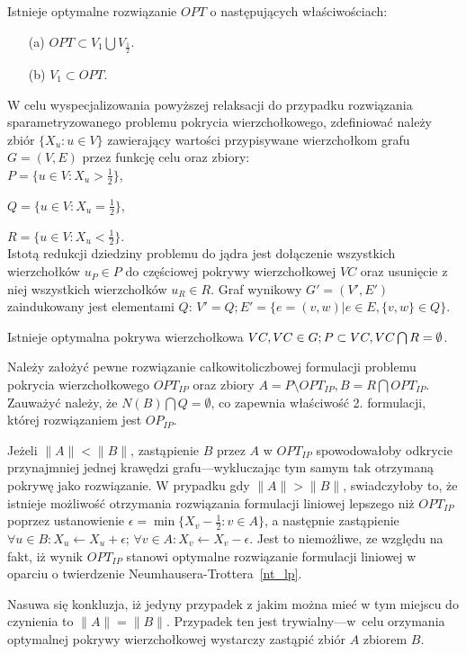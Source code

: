 \begin{nt}
  Istnieje optymalne rozwiązanie $OPT$ o następujących właściwościach:
  \begin{itemize}
    \item[(a)] $OPT \subset V_1 \bigcup V_{\frac{1}{2}}$.
    \item[(b)] $V_1 \subset OPT$.
  \end{itemize}
\end{nt}

W celu wyspecjalizowania powyższej relaksacji do przypadku rozwiązania
sparametryzowanego problemu pokrycia wierzchołkowego, zdefiniować należy zbiór 
$\{ X_u : u \in V \}$ zawierający wartości przypisywane wierzchołkom grafu 
$G=(V,E)$ przez funkcję celu oraz zbiory:\\


$P=\{u \in V : X_u>\frac{1}{2}\}$,\par
$Q=\{u \in V : X_u=\frac{1}{2}\}$,\par
$R=\{u \in V : X_u<\frac{1}{2}\}$.\\


Istotą redukcji dziedziny problemu do jądra jest dołączenie wszystkich
wierzchołków $u_P \in P$ do częściowej pokrywy wierzchołkowej $VC$ oraz 
usunięcie z niej wszystkich wierzchołków $u_R \in R$.
Graf wynikowy $G\prime=(V\prime, E\prime)$ zaindukowany jest elementami $Q$: 
$V\prime=Q; E\prime=\{e=(v, w)| e \in E, \{v, w\} \in Q\}$.

\begin{theorem}
  Istnieje optymalna pokrywa wierzchołkowa
  $VC, VC \in G;\\P \subset VC, VC \bigcap R = \emptyset$.
\end{theorem}
\begin{bproof}
  Należy założyć pewne rozwiązanie całkowitoliczbowej formulacji problemu 
  pokrycia wierzchołkowego $OPT_{IP}$ oraz zbiory 
  ${A = P \setminus OPT_{IP}, B = R \bigcap OPT_{IP}}$.
  Zauważyć należy, że $N(B) \bigcap Q = \emptyset$, co zapewnia właściwość 2.
  formulacji, której rozwiązaniem jest $OP_{IP}$.


  Jeżeli $\|A\|<\|B\|$, zastąpienie $B$ przez $A$ w $OPT_{IP}$ spowodowałoby
  odkrycie przynajmniej jednej krawędzi grafu---wykluczając tym samym
  tak otrzymaną pokrywę jako rozwiązanie.
  W prypadku gdy $\|A\|>\|B\|$, swiadczyłoby to, że istnieje możliwość
  otrzymania rozwiązania formulacji liniowej lepszego niż $OPT_{IP}$ poprzez
  ustanowienie $\epsilon = \min\{X_v-\frac{1}{2}: v \in A\}$, a następnie
  zastąpienie $\forall{u \in B}:X_u \leftarrow X_u + \epsilon$; 
  $\forall{v \in A}: X_v \leftarrow X_v -\epsilon$.
  Jest to niemożliwe, ze względu na fakt, iż wynik $OPT_{IP}$ stanowi optymalne 
  rozwiązanie formulacji liniowej w oparciu o twierdzenie
  Neumhausera-Trottera~\ref{nt_lp}.

  Nasuwa się konkluzja, iż jedyny przypadek z jakim można mieć w tym miejscu do 
  czynienia to $\|A\|=\|B\|$.
  Przypadek ten jest trywialny---w~celu orzymania optymalnej pokrywy wierzchołkowej 
  wystarczy zastąpić zbiór $A$ zbiorem $B$.
\end{bproof}

